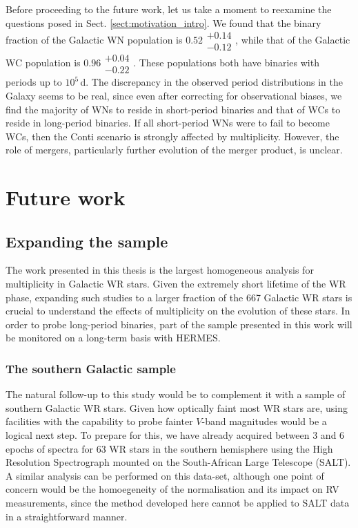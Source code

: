 Before proceeding to the future work, let us take a moment to reexamine the questions posed in Sect. \ref{sect:motivation_intro}. We found that the binary fraction of the Galactic WN population is $0.52\substack{+0.14 \\ -0.12}$, while that of the Galactic WC population is $0.96\substack{+0.04 \\ -0.22}$. These populations both have binaries with periods up to $10^5\,$d. The discrepancy in the observed period distributions in the Galaxy seems to be real, since even after correcting for observational biases, we find the majority of WNs to reside in short-period binaries and that of WCs to reside in long-period binaries. If all short-period WNs were to fail to become WCs, then the Conti scenario is strongly affected by multiplicity. However, the role of mergers, particularly further evolution of the merger product, is unclear.

\section{Future work}

\subsection{Expanding the sample}

The work presented in this thesis is the largest homogeneous analysis for multiplicity in Galactic WR stars. Given the extremely short lifetime of the WR phase, expanding such studies to a larger fraction of the 667 Galactic WR stars is crucial to understand the effects of multiplicity on the evolution of these stars. In order to probe long-period binaries, part of the sample presented in this work will be monitored on a long-term basis with HERMES.

\subsubsection{The southern Galactic sample}

The natural follow-up to this study would be to complement it with a sample of southern Galactic WR stars. Given how optically faint most WR stars are, using facilities with the capability to probe fainter $V$-band magnitudes would be a logical next step. To prepare for this, we have already acquired between 3 and 6 epochs of spectra for 63 WR stars in the southern hemisphere using the High Resolution Spectrograph mounted on the  South-African Large Telescope (SALT). A similar analysis can be performed on this data-set, although one point of concern would be the homoegeneity of the normalisation and its impact on RV measurements, since the method developed here cannot be applied to SALT data in a straightforward manner.

